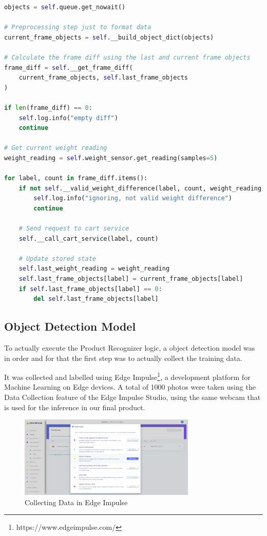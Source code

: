 \documentclass[openright]{normas-utf-tex} %
\begin{document}
\begin{lstlisting}[language=Python,caption={Product Recognizer thread logic}]
objects = self.queue.get_nowait()

# Preprocessing step just to format data
current_frame_objects = self.__build_object_dict(objects)

# Calculate the frame diff using the last and current frame objects
frame_diff = self.__get_frame_diff(
    current_frame_objects, self.last_frame_objects
)

if len(frame_diff) == 0:
    self.log.info("empty diff")
    continue

# Get current weight reading
weight_reading = self.weight_sensor.get_reading(samples=5)

for label, count in frame_diff.items():
    if not self.__valid_weight_difference(label, count, weight_reading):
        self.log.info("ignoring, not valid weight difference")
        continue

    # Send request to cart service
    self.__call_cart_service(label, count)

    # Update stored state
    self.last_weight_reading = weight_reading
    self.last_frame_objects[label] = current_frame_objects[label]
    if self.last_frame_objects[label] == 0:
        del self.last_frame_objects[label]
\end{lstlisting}

\subsection{Object Detection Model}

To actually execute the Product Recognizer logic, a object detection model was
in order and for that the first step was to actually collect the training data.

It was collected and labelled using Edge
Impulse\footnote{https://www.edgeimpulse.com/}, a development platform for
Machine Learning on Edge devices. A total of 1000 photos were taken using the
Data Collection feature of the Edge Impulse Studio, using the same webcam that
is used for the inference in our final product.

\begin{figure}[H]
	\centering
	\includegraphics[width=0.75\textwidth]{./images/edge-impulse-collect-data.png}
	\caption[Collecting Data in Edge Impulse]{Collecting Data in Edge Impulse}
    \label{fig:diff}
\end{figure}
\end{document}
